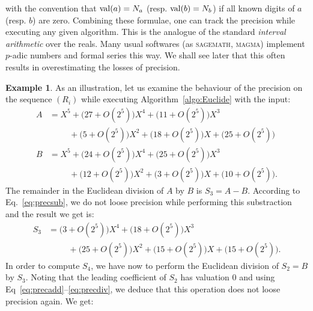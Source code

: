 \documentclass{jT}
\numberwithin{equation}{section}
\DeclareMathOperator{\val}{val}
\theoremstyle{definition}
\newtheorem{ex}[theo]{Example}
\renewcommand{\val}{\text{\rm val}}
\begin{document}

\noindent
with the convention that $\val(a) = N_a$ (resp. $\val(b) = N_b$) if all
known digits of $a$ (resp. $b$) are zero.
Combining these formulae, one can track the precision while executing 
any given algorithm. This is the analogue of the standard \emph{interval 
arithmetic} over the reals. Many usual softwares (as \textsc{sagemath}, 
\textsc{magma}) implement $p$-adic numbers and formal series this way. 
We shall see later that this often results in overestimating the losses 
of precision.

\begin{ex}
\label{ex:Euclide}
As an illustration, let us examine the behaviour of the precision
on the sequence $(R_i)$ while executing Algorithm~\ref{algo:Euclide} 
with the input:
\begin{align*}
A & = X^5 + 
      \big(27 + O(2^5)\big) X^4 +
      \big(11 + O(2^5)\big) X^3 \\
& \hspace{1cm} + 
      \big(5 + O(2^5)\big) X^2 +
      \big(18 + O(2^5)\big) X +
      \big(25 + O(2^5)\big) \\
B & = X^5 + 
      \big(24 + O(2^5)\big) X^4 +
      \big(25 + O(2^5)\big) X^3 \\
& \hspace{1cm} + 
      \big(12 + O(2^5)\big) X^2 +
      \big(3 + O(2^5)\big) X +
      \big(10 + O(2^5)\big).
\end{align*}
The remainder in the Euclidean division of $A$ by $B$ is $S_3 = A-B$.
According to Eq.~\eqref{eq:precsub},
we do not loose precision while performing this substraction and the
result we get is:
\begin{align*}
S_3 & = 
      \big(3 + O(2^5)\big) X^4 +
      \big(18 + O(2^5)\big) X^3 \\
& \hspace{1cm} +
      \big(25 + O(2^5)\big) X^2 +
      \big(15 + O(2^5)\big) X +
      \big(15 + O(2^5)\big).
\end{align*}
In order to compute $S_4$, we have now to perform the Euclidean division 
of $S_2 = B$ by $S_3$. Noting that the leading coefficient of $S_2$ has 
valuation $0$ and using Eq~\eqref{eq:precadd}--\eqref{eq:precdiv}, we 
deduce that this operation does not loose precision again. We get:

\end{ex}
\end{document}
